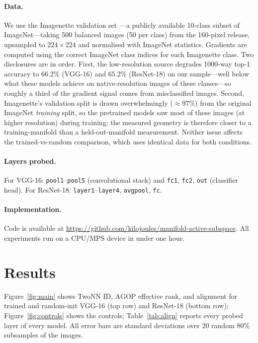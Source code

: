 \documentclass{article}
\begin{document}
\paragraph{Data.} We use the Imagenette validation set \citep{imagenette}---a
publicly available 10-class subset of ImageNet---taking 500 balanced images
(50 per class) from the 160-pixel release, upsampled to $224\times224$ and
normalised with ImageNet statistics.  Gradients are computed using the
correct ImageNet class indices for each Imagenette class.  Two disclosures
are in order.  First, the low-resolution source degrades 1000-way top-1
accuracy to 66.2\% (VGG-16) and 65.2\% (ResNet-18) on our sample---well
below what these models achieve on native-resolution images of these
classes---so roughly a third of the gradient signal comes from
misclassified images.  Second, Imagenette's validation split is drawn
overwhelmingly ($\approx$97\%) from the original ImageNet \emph{training}
split, so the pretrained models saw most of these images (at higher
resolution) during training; the measured geometry is therefore closer to a
training-manifold than a held-out-manifold measurement.  Neither issue
affects the trained-vs-random comparison, which uses identical data for both
conditions.

\paragraph{Layers probed.}
For VGG-16: \texttt{pool1}--\texttt{pool5} (convolutional stack) and
\texttt{fc1}, \texttt{fc2}, \texttt{out} (classifier head).
For ResNet-18: \texttt{layer1}--\texttt{layer4}, \texttt{avgpool},
\texttt{fc}.

\paragraph{Implementation.} Code is available at
\url{https://github.com/kilojoules/manifold-active-subspace}.
All experiments run on a CPU/MPS device in under one hour.

\section{Results}
\label{sec:results}

Figure~\ref{fig:main} shows TwoNN ID, AGOP effective rank, and alignment for
trained and random-init VGG-16 (top row) and ResNet-18 (bottom row);
Figure~\ref{fig:controls} shows the controls; Table~\ref{tab:align} reports
every probed layer of every model.  All error bars are standard deviations
over 20 random 80\% subsamples of the images.
\end{document}
